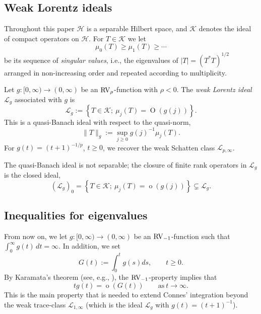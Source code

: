 \documentclass[10pt, a4paper]{amsart}
\newcommand{\sL}{\mathscr{L}}
\newcommand{\sH}{\mathscr{H}}
\newcommand{\sK}{\mathscr{K}}
\newcommand{\op}{\operatorname}
\numberwithin{equation}{section}
\theoremstyle{definition}
\theoremstyle{remark}
\newcommand{\RV}{\textup{RV}}
\begin{document}
\subsection{Weak Lorentz ideals}
Throughout this paper $\sH$ is a separable Hilbert space, and $\sK$ denotes the ideal of compact operators on $\sH$. For $T\in \sK$ we let \[
\mu_0(T)\geq \mu_1(T)\geq \cdots\] be its sequence of \emph{singular values}, i.e., the eigenvalues of $|T|=(T^*T)^{1/2}$ arranged in non-increasing order and repeated according to multiplicity. 

Let $g:[0,\infty) \rightarrow (0,\infty)$ be an $\RV_\rho$-function with $\rho<0$. The \emph{weak Lorentz ideal} $\sL_g$ associated with $g$ is 
\begin{equation*}
\sL_g:= \left\{T \in \sK; \ \mu_j(T)= \op{O}\left(g(j)\right)\right\}.
\end{equation*}
This is a quasi-Banach ideal with respect to the quasi-norm, 
\begin{equation*}
 \|T\|_g := \sup_{j\geq 0} g(j)^{-1}\mu_j(T).
\end{equation*}
For $g(t)=(t+1)^{-1/p}$, $t\geq 0$, we recover the weak Schatten class $\sL_{p,\infty}$. 

The quasi-Banach ideal is not separable; the closure of finite rank operators in $\sL_g$ is the closed ideal, 
\begin{equation*}
 (\sL_{g})_0= \left\{T \in \sK; \ \mu_j(T)= \op{o}\left(g(j)\right)\right\} \subsetneq \sL_g.
\end{equation*}

\subsection{Inequalities for eigenvalues} 
From now on, we let  $g:[0,\infty) \rightarrow (0,\infty)$ be an $\RV_{-1}$-function such that $\int_0^\infty g(t)\,dt=\infty$. In addition, we set
\begin{equation*}
 G(t):= \int_0^t g(s)ds, \qquad t\geq 0. 
\end{equation*}
By Karamata's theorem (see, e.g., {\cite{BGT:Cambridge87, BIKS:Springer18}}), the $\RV_{-1}$-property implies that
\begin{equation}\label{eq:Karamata}
 tg(t)=\op{o}(G(t)) \qquad \text{as}\ t\longrightarrow \infty.  
\end{equation}
This is the main property that is needed to extend Connes' integration beyond the weak trace-class $\sL_{1,\infty}$ (which is the ideal $\sL_g$ with $g(t)=(t+1)^{-1}$). 
\end{document}
